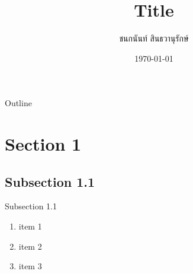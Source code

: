 \documentclass[serif]{beamer}
\title{Title}
\author{ชนกนันท์ สินธวานุรักษ์}
\date{\today}
\begin{document}
\begin{frame}
    \titlepage 
\end{frame}
\logo{}

\begin{frame}{Outline}
    \tableofcontents
\end{frame}

\section{Section 1}
\subsection{Subsection 1.1}
\begin{frame}{Subsection 1.1}
    \begin{enumerate}
        \item<1-> item 1
        \item<2-> item 2
        \item<3-> item 3
    \end{enumerate}
\end{frame}
\end{document}
